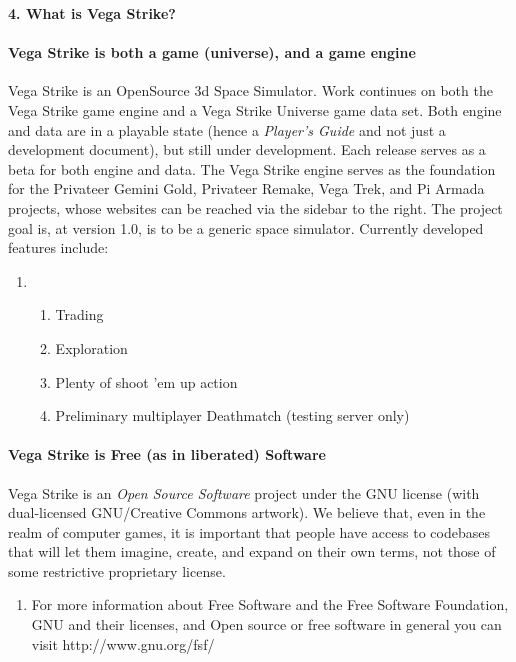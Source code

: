 \documentclass{article}
\begin{document}
\eject \textbf{4. What is Vega Strike?}


\paragraph{Vega Strike is both a game (universe), and a game engine}

Vega Strike is an OpenSource 3d Space Simulator. Work continues on both the Vega Strike game engine and a Vega Strike Universe game data set. Both engine and data are in a playable state (hence a \textit{Player's Guide} and not just a development document), but still under development. Each release serves as a beta for both engine and data. The Vega Strike engine serves as the foundation for the Privateer Gemini Gold, Privateer Remake, Vega Trek, and Pi Armada projects, whose websites can be reached via the sidebar to the right. The project goal is, at version 1.0, is to be a generic space simulator. Currently developed features include: 

\begin{enumerate}
\item \begin{enumerate}
\item  Trading

\item  Exploration

\item  Plenty of shoot 'em up action

\item  Preliminary multiplayer Deathmatch (testing server only)
\end{enumerate}
\end{enumerate}


\paragraph{Vega Strike is Free (as in liberated) Software}

Vega Strike is an \textit{Open Source Software }project under the GNU license (with dual-licensed GNU/Creative Commons artwork). We believe that, even in the realm of computer games, it is important that people have access to codebases that will let them imagine, create, and expand on their own terms, not those of some restrictive proprietary license. 

\begin{enumerate}
\item  For more information about Free Software and the Free Software Foundation, GNU and their licenses, and Open source or free software in general you can visit http://www.gnu.org/fsf/ 
\end{enumerate}
\end{document}
